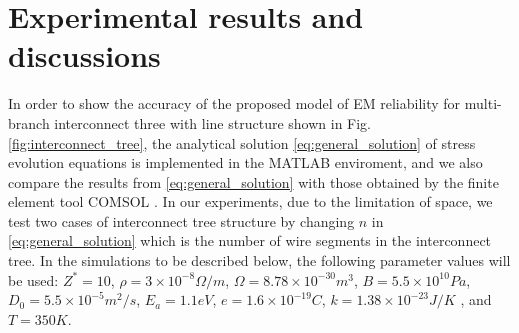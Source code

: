 \section{Experimental results and discussions}
\label{sec:experimental_results}
In order to show the accuracy of the proposed model of EM reliability
for multi-branch interconnect three with line structure shown in
Fig. \ref{fig:interconnect_tree}, the analytical solution
\eqref{eq:general_solution} of stress evolution equations is
implemented in the MATLAB enviroment, and we also compare the results
from \eqref{eq:general_solution} with those obtained by the finite
element tool COMSOL \cite{COMSOL}. In our experiments, due to the
limitation of space, we test two cases of interconnect tree structure
by changing $n$ in \eqref{eq:general_solution} which is the number of
wire segments in the interconnect tree. In the simulations to be
described below, the following parameter values will be used:
$Z^*=10$, $\rho=3\times10^{-8} \Omega/m$,
$\Omega=8.78\times10^{-30}m^3$, $B=5.5\times10^{10} Pa$,
$D_0=5.5\times10^{-5} m^2/s$, $E_a=1.1eV$, $e=1.6\times10^{-19}C$,
$k=1.38\times10^{-23}J/K$ , and $T=350K$.


